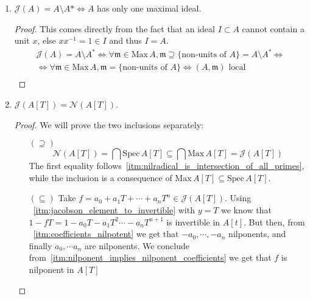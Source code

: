 \begin{problem}
\begin{enumerate}[label=(\theproblem.\arabic*),ref=\theproblem.\arabic*]
        \item $\mathcal{J}(A) = A \setminus A* \Leftrightarrow A$ has only one maximal ideal.
            \begin{sol}
                \begin{proof}
                    This comes directly from the fact that an ideal $I \subset A$ cannot contain a unit $x$, else $x x^{-1} = 1 \in I$ and thus $I = A$.
                    \begin{gather*}
                        \mathcal{J}(A) = A \setminus A^* \Leftrightarrow \forall \mathfrak{m} \in \text{Max}\,A, \mathfrak{m} \supseteq \{\text{non-units of }A\} = A \setminus A^* \Leftrightarrow\\
                        \Leftrightarrow \forall \mathfrak{m} \in \text{Max}\,A, \mathfrak{m} = \{\text{non-units of }A\} \Leftrightarrow (A, \mathfrak{m}) \text{ local}\\
                    \end{gather*}
                \end{proof}
            \end{sol}

        \item \label{itm:nilradical_equals_jacobson_in_polynomial_ring}
        $\mathcal{J}(A[T]) = \mathcal{N}(A[T])$.
            \begin{sol}
                \begin{proof}
                We will prove the two inclusions separately:
                    \begin{itemize}
                        \item[$(\supseteq)$]
                        \[ \mathcal{N}(A[T]) = \bigcap \text{Spec}\,A[T] \subseteq \bigcap \text{Max}\,A[T] = \mathcal{J}(A[T]) \]
                        The first equality follows~\ref{itm:nilradical_is_intersection_of_all_primes}, while the inclusion is a consequence of $\text{Max}\,A[T] \subseteq \text{Spec}\,A[T]$.
                        \item[$(\subseteq)$]
                        Take $f = a_0 + a_1 T + \cdots + a_n T^n \in \mathcal{J}(A[T])$.
                        Using ~\ref{itm:jacobson_element_to_invertible} with $y = T$ we know that $1 - f T = 1 - a_0 T - a_1 T^2 \cdots - a_n T^{n + 1}$ is invertible in $A[t]$.
                        But then, from ~\ref{itm:coefficients_nilpotent} we get that $-a_0, \cdots, -a_n$ nilponents, and finally $a_0, \cdots a_n$ are nilponents.
                        We conclude from~\ref{itm:nilponent_implies_nilponent_coefficients} we get that $f$ is nilponent in $A[T]$
                    \end{itemize}
                \end{proof}
            \end{sol}
    \end{enumerate}
\end{problem}
